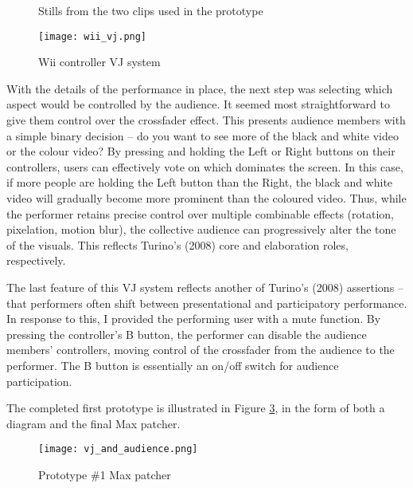 \begin{figure}[t]
	\centering

	\hspace{0.1cm}
	\caption{Stills from the two clips used in the prototype}

	\label{prototyping1.3}
\end{figure}

\begin{figure}[t]
	\centering

	\texttt{[image: wii\_vj.png]}
	\caption{Wii controller VJ system}

	\label{prototyping1.4}
\end{figure}

With the details of the performance in place, the next step was selecting which aspect would be controlled by the audience. It seemed most straightforward to give them control over the crossfader effect. This presents audience members with a simple binary decision -- do you want to see more of the black and white video or the colour video? By pressing and holding the Left or Right buttons on their controllers, users can effectively vote on which dominates the screen. In this case, if more people are holding the Left button than the Right, the black and white video will gradually become more prominent than the coloured video. Thus, while the performer retains precise control over multiple combinable effects (rotation, pixelation, motion blur), the collective audience can progressively alter the tone of the visuals. This reflects Turino's (2008) core and elaboration roles, respectively.

The last feature of this VJ system reflects another of Turino's (2008) assertions -- that performers often shift between presentational and participatory performance. In response to this, I provided the performing user with a mute function. By pressing the controller's B button, the performer can disable the audience members' controllers, moving control of the crossfader from the audience to the performer. The B button is essentially an on/off switch for audience participation.

The completed first prototype is illustrated in Figure \ref{prototyping1.5}, in the form of both a diagram and the final Max patcher.

\begin{figure}[t]
	\centering

	\texttt{[image: vj\_and\_audience.png]}
	\caption{Prototype \#1 Max patcher}

	\label{prototyping1.5}
\end{figure}


